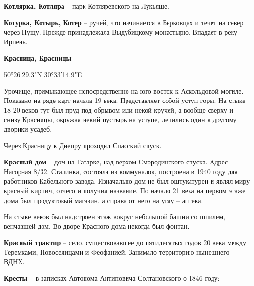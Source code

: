 

\textbf{Котлярка, Котляра} – парк Котляревского на Лукьяше.\\

\medskip

\textbf{Котурка, Котырь, Котер} – ручей, что начинается в Берковцах и течет на север через Пущу. Прежде принадлежала Выдубицкому монастырю. Впадает в реку Ирпень.\\

\medskip

\textbf{Красница, Красницы} 

50°26'29.3"N 30°33'14.9"E

Урочище, примыкающее непосредственно на юго-восток к Аскольдовой могиле. Показано на ряде карт начала 19 века. Представляет собой уступ горы. На стыке 18-20 веков тут был пруд под обрывом или некой кручей, а вообще сверху и снизу Красницы, окружая некий пустырь на уступе, лепились один к другому дворики усадеб.

Через Красницу к Днепру проходил Спасский спуск.\\

\medskip

\textbf{Красный дом} – дом на Татарке, над верхом Смородинского спуска. Адрес Нагорная 8/32. Сталинка, состояла из коммуналок, построена в 1940 году для работников Кабельного завода. Изначально дом не был оштукатурен и являл миру красный кирпич, отчего и получил название. По начало 21 века на первом этаже дома был продуктовый магазин, а справа от него на углу – аптека.

На стыке веков был надстроен этаж вокруг небольшой башни со шпилем, венчавшей дом. Во дворе Красного дома некогда был фонтан.\\    

\medskip

\textbf{Красный трактир} – село, существовавшее до пятидесятых годов 20 века между Теремками, Новоселицами и Феофанией. Занимало территорию нынешнего ВДНХ.\\


\medskip

\textbf{Кресты} – в записках Автонома Антиповича Солтановского о 1846 году:

